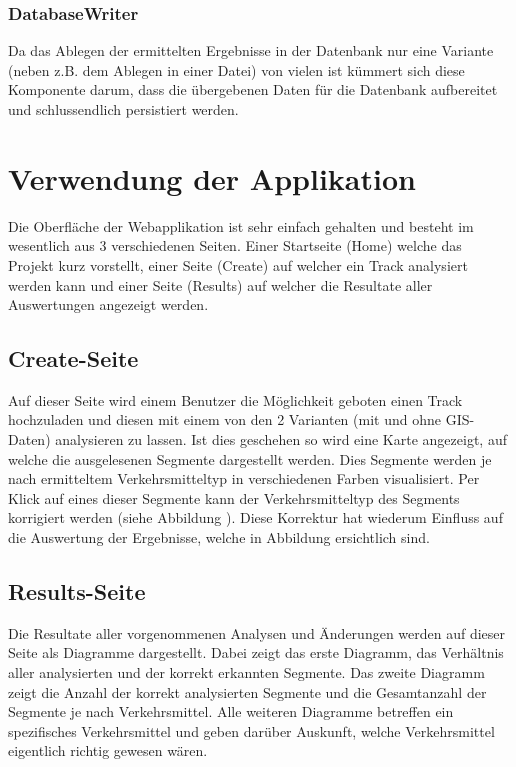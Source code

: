 \subsubsection{DatabaseWriter}
Da das Ablegen der ermittelten Ergebnisse in der Datenbank  nur eine Variante (neben z.B. dem Ablegen  in einer Datei) von vielen ist kümmert sich diese Komponente darum, dass die übergebenen Daten für die Datenbank aufbereitet und schlussendlich persistiert werden.

\section{Verwendung der Applikation}
Die Oberfläche der Webapplikation ist sehr einfach gehalten und besteht im wesentlich aus 3 verschiedenen Seiten. Einer Startseite (Home) welche das Projekt kurz vorstellt, einer Seite (Create) auf welcher ein Track analysiert werden kann und einer Seite (Results) auf welcher die Resultate aller Auswertungen angezeigt werden.

\subsection{Create-Seite}
Auf dieser Seite wird einem Benutzer die Möglichkeit geboten einen Track hochzuladen und diesen mit einem von den 2 Varianten (mit und ohne GIS-Daten) analysieren zu lassen. Ist dies geschehen so wird eine Karte angezeigt, auf welche die ausgelesenen Segmente dargestellt werden. Dies Segmente werden je nach ermitteltem Verkehrsmitteltyp in verschiedenen Farben visualisiert. Per Klick auf eines dieser Segmente kann der Verkehrsmitteltyp des Segments korrigiert werden (siehe Abbildung ). Diese Korrektur hat wiederum Einfluss auf die Auswertung der Ergebnisse, welche in Abbildung  ersichtlich sind.


\subsection{Results-Seite}
Die Resultate aller vorgenommenen Analysen und Änderungen werden auf dieser Seite als Diagramme dargestellt. Dabei zeigt das erste Diagramm, das Verhältnis aller analysierten und der korrekt erkannten Segmente. Das zweite Diagramm zeigt die Anzahl der korrekt analysierten Segmente und die Gesamtanzahl der Segmente je nach Verkehrsmittel. Alle weiteren Diagramme betreffen ein spezifisches Verkehrsmittel und geben darüber Auskunft, welche Verkehrsmittel eigentlich richtig gewesen wären. 

